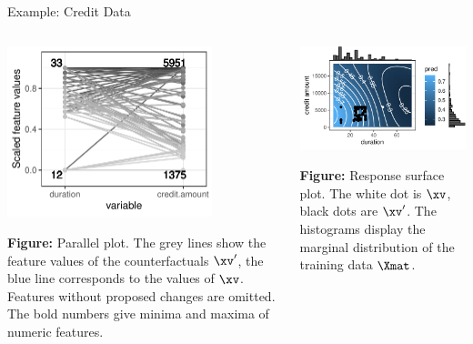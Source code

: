 \documentclass[11pt,compress,t,notes=noshow, aspectratio=169, xcolor=table]{beamer}
\begin{document}
\begin{frame}{Example: Credit Data}
	\begin{columns}
				\begin{column}{0.5\textwidth}  
			\begin{center}
				\includegraphics[width=0.75\textwidth]{figure/counterfactuals_credit_parallel}
			\end{center}
		\vspace{-0.2cm}
			\scriptsize{\textbf{Figure:} Parallel plot. 
				The grey lines show the feature values of the counterfactuals $\xv'$, the blue line corresponds to the values of $\xv$. Features without proposed changes are omitted. The bold numbers give minima and maxima of numeric features.} 
			
		\end{column}
		\begin{column}{0.5\textwidth}
			\begin{center}
				\includegraphics[width=1\textwidth]{figure/counterfactuals_credit_heat}
			\end{center}
		\vspace{-0.2cm}
			\scriptsize{\textbf{Figure:} Response surface plot. 
				The white dot is $\xv$, black dots are $\xv'$. The histograms display the marginal distribution of the training data $\Xmat$.} 
				

\end{column}
\end{columns}
\end{frame}
\end{document}
